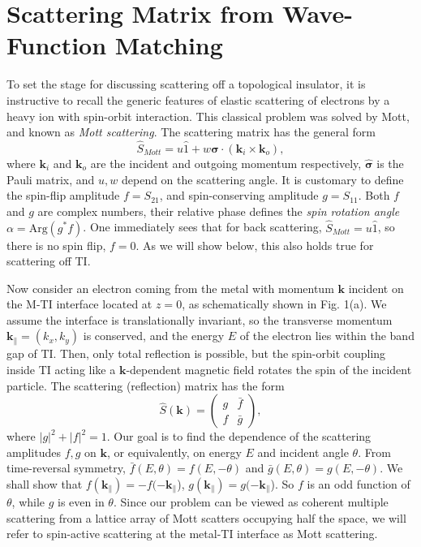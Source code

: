 \documentclass[11pt]{report}
\def\v#1{\mathbf{#1}}
\begin{document}
\section{Scattering Matrix from Wave-Function Matching} 

To set the stage for discussing scattering off a topological insulator, it is instructive to recall the generic features of elastic scattering of electrons by a heavy ion with spin-orbit interaction. This classical problem was solved by Mott, and known as {\it Mott scattering}. 
The scattering matrix has the general form \cite{mott}
\[
\hat{S}_{Mott}=u\hat{1}+w\hat{\boldsymbol{\sigma}}\cdot (\mathbf{k}_{i}\times \mathbf{k}_{o}),
\]
where $\mathbf{k}_{i}$ and $\mathbf{k}_{o}$ are the incident and outgoing momentum respectively, $\hat{\boldsymbol{\sigma}}$ is the Pauli matrix, and $u,w$ depend on the scattering angle. It is customary to
define the spin-flip amplitude $f=S_{21}$, and spin-conserving amplitude $g=S_{11}$. 
Both $f$ and $g$ are complex numbers, their relative phase defines the {\it spin rotation angle} $\alpha=\mathrm{Arg}(g^*f)$.
One immediately sees that for back scattering, $\hat{S}_{Mott}=u\hat{1}$, so there is no spin flip, $f=0$. As we will show below, this also holds true for scattering off TI.

Now consider an electron coming from the metal 
with momentum $\v{k}$ incident on the M-TI interface located at $z=0$, 
as schematically shown in Fig. 1(a). 
We assume the interface is 
translationally invariant, so the transverse momentum $\v{k}_{\parallel}=(k_x,k_y)$ is 
conserved, and the energy $E$ of the electron 
lies within the band gap of TI. Then, only total reflection 
is possible, but the spin-orbit coupling inside TI acting like a $\v{k}$-dependent magnetic field rotates the spin of the incident particle. The scattering (reflection) matrix has the form
\[
\hat{S}(\v{k})=\left(
\begin{array}{ll}
  g & \bar{f}   \\
  f & \bar{g}
  \end{array}
\right),
\]
where $|g|^2+|f|^2=1$. 
Our goal is to find the dependence of the scattering amplitudes $f,g$ 
on $\v{k}$, or equivalently, on energy $E$ and 
incident angle $\theta$. From time-reversal symmetry, 
$\bar{f}(E,\theta)=f(E,-\theta)$ and $\bar{g}(E,\theta)=g(E,-\theta)$.
We shall show that
$f(\v{k}_{\parallel})=-f(-\v{k}_{\parallel}$),
$g(\v{k}_{\parallel})=g(-\v{k}_{\parallel}$). So 
$f$ is an odd function of $\theta$, while $g$ is even in $\theta$.  
Since our problem can be viewed as coherent multiple scattering from a lattice 
array of Mott scatters occupying half the space, we will refer to
spin-active scattering at the metal-TI interface as Mott scattering.
\end{document}
